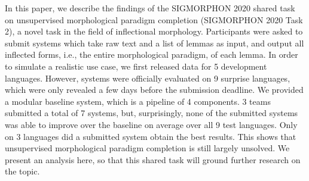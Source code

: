 In this paper, we describe the findings of the SIGMORPHON 2020 shared task on unsupervised morphological paradigm completion (SIGMORPHON 2020 Task 2), a novel task in the field of inflectional morphology. Participants were asked to submit systems which take raw text and a list of lemmas as input, and output all inflected forms, i.e., the entire morphological paradigm, of each lemma. In order to simulate a realistic use case, we first released data for 5 development languages. However, systems were officially evaluated on 9 surprise languages, which were only revealed a few days before the submission deadline. We provided a modular baseline system, which is a pipeline of 4 components. 3 teams submitted a total of 7 systems, but, surprisingly, none of the submitted systems was able to improve over the baseline on average over all 9 test languages. Only on 3 languages did a submitted system obtain the best results. This shows that unsupervised morphological paradigm completion is still largely unsolved. We present an analysis here, so that this shared task will ground further research on the topic.
